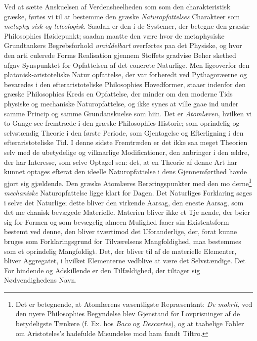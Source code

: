 Ved at sætte Anskuelsen af Verdensheelheden som 
som den charakteristisk græske, førtes vi til at bestemme
den græske \emph{Naturopfattelses} Charakteer som \emph{metaphy\-%
sisk og teleologisk}. Saadan er den i de Systemer, der
betegne den græske Philosophies Høidepunkt; saadan maatte
den være hvor de metaphysiske Grundtankers Begrebsforhold
\emph{umiddelbart} overførtes paa det Physiske, og hvor den arti\-%
culerede Forms Realisation gjennem Stoffets gradvise Beher\-%
skethed afgav Synspunktet for Opfattelsen af det concrete
Naturlige. Men ligeoverfor den platonisk-aristoteliske Natur\-%
opfattelse, der var forberedt ved Pythagoræerne og bevaredes
i den efteraristoteliske Philosophies Hovedformer, staaer indenfor
den græske Philosophies Kreds en Opfattelse, der minder om
den moderne Tids physiske og mechaniske Naturopfattelse, og
ikke synes at ville gaae ind under samme Princip og samme
Grundanskuelse som hiin. Det er \emph{Atomlæren}, hvilken vi
to Gange see fremtræde i den græske Philosophies Historie;
som oprindelig og selvstændig Theorie i den første Periode,
som Gjentagelse og Efterligning i den efteraristoteliske Tid.
I denne sidste Fremtræden er det ikke saa meget Theorien
selv med de ubetydelige og vilkaarlige Modificationer, den
anbringer i den ældre, der har Interesse, som selve Optagel\-%
sen: det, at en Theorie af denne Art har kunnet optages
efterat den ideelle Naturopfattelse i dens Gjennemførthed
havde gjort sig gjældende.
 \setcounter{footnote}{0}
Den græske Atomlæres Berøringspunkter med den mo\-%
derne\footnote{Det er betegnende, at Atomlærens væsentligste Repræsentant: \emph{De\-%
mokrit}, ved den nyere Philosophies Begyndelse blev Gjenstand
for Lovprisninger af de betydeligste Tænkere (f. Ex. hos \emph{Baco} og
\emph{Descartes}), og at taabelige Fabler om Aristoteles's hadefulde
Misundelse mod ham fandt Tiltro.} \emph{mechaniske} Naturopfattelse ligge klart for Dagen.
Det Naturliges Forklaring søges i selve det Naturlige; dette
bliver den virkende Aarsag, den eneste Aarsag, som det me\-%
chanisk bevægede Materielle. Materien bliver ikke et Tje\-%
nende, der bøier sig for Formen og som bevægelig almeen
Mulighed faaer sin Existentsform bestemt ved denne, den
bliver tværtimod det Uforanderlige, der, forat kunne bruges
som Forklaringsgrund for Tilværelsens Mangfoldighed, maa
bestemmes som et oprindelig Mangfoldigt. Det, der bliver
til af de materielle Elementer, bliver Aggregatet, i hvilket
Elementerne vedblive at være det Selvstændige. Det For\-%
bindende og Adskillende er den Tilfældighed, der tiltager sig
Nødvendighedens Navn.

